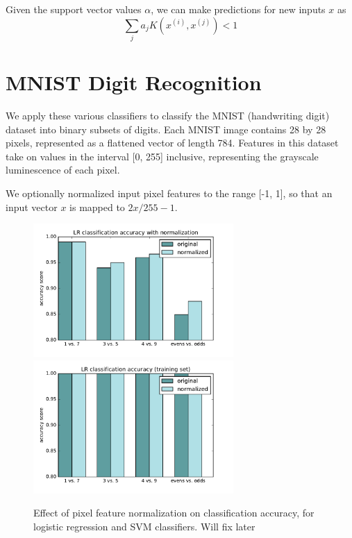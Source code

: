 \documentclass{article}
\begin{document}
\begin{multicols}{2}

Given the support vector values $\alpha$, we can make predictions for new inputs $x$ as 
\begin{equation}
    \sum_j{a_j K(x^{(i)},x^{(j)}) < 1 }
\end{equation}


\section{MNIST Digit Recognition}

We apply these various classifiers to classify the MNIST (handwriting digit) dataset into binary subsets of digits. Each MNIST image contains 28 by 28 pixels, represented as a flattened vector of length 784. Features in this dataset take on values in the interval [0, 255] inclusive, representing the grayscale luminescence of each pixel.

We optionally normalized input pixel features to the range [-1, 1], so that an input vector $x$ is mapped to $2x/255-1$.

\begin{figure}[h]
   \centering
	\includegraphics[width=3in]{img/4-1-normalization.pdf}
	\includegraphics[width=3in]{img/4-1-normalization-train.pdf}
   \caption{Effect of pixel feature normalization on classification accuracy, for logistic regression and SVM classifiers. Will fix later}
   \label{fig:2-3-gaussian-rbf}
\end{figure}

\end{multicols}
\end{document}
